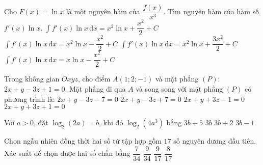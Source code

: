 \begin{ex}%
Cho $F(x)=\ln x$ là một nguyên hàm của $\dfrac{f(x)}{x^3}$. Tìm nguyên hàm của hàm số $f'(x) \ln x$.
\choice
{$\displaystyle\int f'(x) \ln x \mathrm{\,d} x=x^2 \ln x+\dfrac{x^2}{2}+C$}
{\True $\displaystyle\int f'(x) \ln x \mathrm{\,d} x=x^2 \ln x-\dfrac{x^2}{2}+C$}
{$\displaystyle\int f'(x) \ln x \mathrm{\,d} x=x^2 \ln x+\dfrac{3 x^2}{2}+C$}
{$\displaystyle\int f'(x) \ln x \mathrm{\,d} x=x \ln x-\dfrac{x^2}{2}+C$}

\end{ex}
\begin{ex}%
Trong không gian $O x y z$, cho điểm $A(1; 2;-1)$ và mặt phẳng $(P)$: $2 x+y-3 z+1=0$. Mặt phẳng đi qua $A$ và song song với mặt phẳng $(P)$ có phương trình là:
\choice
{\True $2 x+y-3 z-7=0$}
{$2 x+y-3 z+7=0$}
{$2 x+y+3 z-1=0$}
{$2 x+y+3 z+1=0$}

\end{ex}
\begin{ex}%
Với $a>0$, đặt $\log_2(2 a)=b$, khi đó $\log_2\left(4 a^3\right)$ bằng
\choice
{$3 b+5$}
{$3 b$}
{$3 b+2$}
{\True $3 b-1$}

\end{ex}
\begin{ex}%
Chọn ngẫu nhiên đồng thời hai số từ tập hợp gồm $17$ số nguyên dương đầu tiên. Xác suất để chọn được hai số chắn bằng
\choice
{\True $\dfrac{7}{34}$}
{$\dfrac{9}{34}$}
{$\dfrac{9}{17}$}
{$\dfrac{8}{17}$}

\end{ex}

